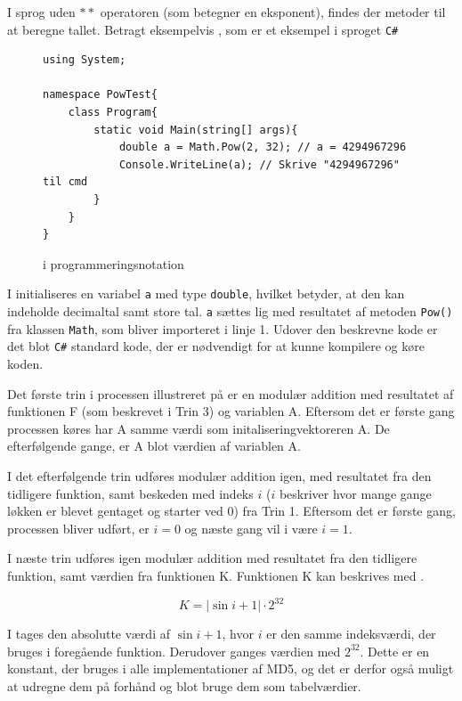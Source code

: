 \documentclass[12pt]{article}
\begin{document}
I sprog uden $**$ operatoren (som betegner en eksponent), findes der metoder til at beregne tallet. Betragt eksempelvis \figureautorefname{~\ref{code:step-4-mod_add-c}}, som er et eksempel i sproget \verb|C#|


\begin{figure}[!ht]
\begin{verbatim}
using System;

namespace PowTest{
    class Program{
        static void Main(string[] args){
            double a = Math.Pow(2, 32); // a = 4294967296
            Console.WriteLine(a); // Skrive "4294967296" til cmd
        }
    }
}
\end{verbatim}
\caption{\equationautorefname{~\ref{step-4-func}} i programmeringsnotation}
\label{code:step-4-mod_add-c}
\end{figure}
I \figureautorefname{~\ref{code:step-4-mod_add-c}} initialiseres en variabel \verb|a| med type \verb|double|, hvilket betyder, at den kan indeholde decimaltal samt store tal. \verb|a| sættes lig med resultatet af metoden \verb|Pow()| fra klassen \verb|Math|, som bliver importeret i linje 1. Udover den beskrevne kode er det blot \verb|C#| standard kode, der er nødvendigt for at kunne kompilere og køre koden. 

Det første trin i processen illustreret på \figureautorefname{~\ref{fig:aux-func-used}} er en modulær addition med resultatet af funktionen F (som beskrevet i Trin 3) og variablen A. Eftersom det er første gang processen køres har A samme værdi som initaliseringvektoreren A. De efterfølgende gange, er A blot værdien af variablen A. 

I det efterfølgende trin udføres modulær addition igen, med resultatet fra den tidligere funktion, samt beskeden med indeks $i$ ($i$ beskriver hvor mange gange løkken er blevet gentaget og starter ved 0) fra Trin 1. Eftersom det er første gang, processen bliver udført, er $i=0$ og næste gang vil i være $i=1$. 

I næste trin udføres igen modulær addition med resultatet fra den tidligere funktion, samt værdien fra funktionen K. Funktionen K kan beskrives med \equationautorefname{~\ref{step-4-sin-func}}.

\begin{equation}\label{step-4-sin-func}
K = | \sin{i+1} | \cdot 2^{32}
\end{equation}

I \equationautorefname{~\ref{step-4-sin-func}} tages den absolutte værdi af $\sin{i+1}$, hvor $i$ er den samme indeksværdi, der bruges i foregående funktion. Derudover ganges værdien med $2^{32}$. Dette er en konstant, der bruges i alle implementationer af MD5, og det er derfor også muligt at udregne dem på forhånd og blot bruge dem som tabelværdier.  
\end{document}
